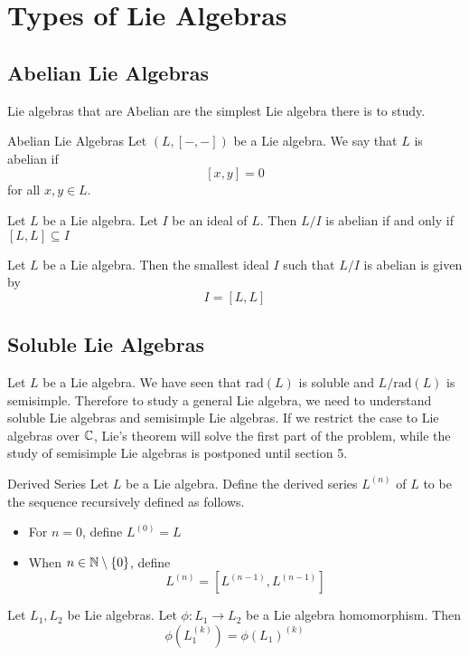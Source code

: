 \documentclass[a4paper]{article}
\begin{document}
\pagebreak
\section{Types of Lie Algebras}
\subsection{Abelian Lie Algebras}
Lie algebras that are Abelian are the simplest Lie algebra there is to study. 

\begin{defn}{Abelian Lie Algebras}{} Let $(L,[-,-])$ be a Lie algebra. We say that $L$ is abelian if $$[x,y]=0$$ for all $x,y\in L$. 
\end{defn}

\begin{lmm}{}{} Let $L$ be a Lie algebra. Let $I$ be an ideal of $L$. Then $L/I$ is abelian if and only if $[L,L]\subseteq I$
\end{lmm}

\begin{crl}{}{} Let $L$ be a Lie algebra. Then the smallest ideal $I$ such that $L/I$ is abelian is given by $$I=[L,L]$$
\end{crl}

\subsection{Soluble Lie Algebras}
Let $L$ be a Lie algebra. We have seen that $\text{rad}(L)$ is soluble and $L/\text{rad}(L)$ is semisimple. Therefore to study a general Lie algebra, we need to understand soluble Lie algebras and semisimple Lie algebras. If we restrict the case to Lie algebras over $\mathbb{C}$, Lie's theorem will solve the first part of the problem, while the study of semisimple Lie algebras is postponed until section 5. 

\begin{defn}{Derived Series}{} Let $L$ be a Lie algebra. Define the derived series $L^{(n)}$ of $L$ to be the sequence recursively defined as follows. 
\begin{itemize}
\item For $n=0$, define $L^{(0)}=L$
\item When $n\in\mathbb{N}\setminus\{0\}$, define $$L^{(n)}=[L^{(n-1)},L^{(n-1)}]$$
\end{itemize}
\end{defn}

\begin{lmm}{}{} Let $L_1,L_2$ be Lie algebras. Let $\phi:L_1\to L_2$ be a Lie algebra homomorphism. Then $$\phi(L_1^{(k)})=\phi(L_1)^{(k)}$$
\end{lmm}
\end{document}
